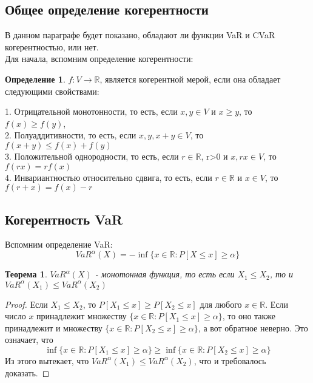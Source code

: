 \documentclass[18pt,a4paper]{article}
\theoremstyle{plain}
\newtheorem{Th}{Теорема}[section]
\theoremstyle{definition}
\newtheorem{Def}{Определение}[section]
\begin{document}
\centering\subsection{Общее определение когерентности}
\flushleft
В данном параграфе будет показано, обладают ли функции VaR и CVaR когерентностью, или нет.\\
Для начала, вспомним определение когерентности:\\
\vspace{1pc}
\begin{Def} \label{main}
$f:V \rightarrow \mathbb{R}$, является когерентной мерой, если она обладает следующими свойствами:

1. Отрицательной монотонности, то есть, если $x,y \in V$ и $x\ge y$, то $f(x) \ge f(y)$,\\

2. Полуаддитивности, то есть, если $x,y,x+y \in V$, то $f(x+y) \le f(x) + f(y)$\\

3. Положительной однородности, то есть, если $r \in \mathbb{R}$, r>0 и $x, rx \in V$, то $f(rx) = rf(x)$ \\

4. Инвариантностью относительно сдвига, то есть, если  $r \in \mathbb{R}$ и $x \in V$, то $f(r+x) = f(x) - r$\\

\end{Def}
\vspace{1pc}
\centering\subsection{Когерентность VaR}
\flushleft
Вспомним определение VaR:
$$
VaR^\alpha(X) = -\inf\{x\in \mathbb{R} : P[X \le x] \ge \alpha\}
$$

\begin{Th} \label{main} $VaR^\alpha(X)$ - монотонная функция, то есть если $ X_1 \le X_2$, то и $ VaR^\alpha(X_1) \le VaR^\alpha(X_2)$
\end{Th}

\begin{proof}
Если $X_1\le X_2$, то $P[X_1 \le x] \ge P[X_2 \le x]$ для любого $x \in \mathbb{R}$. Если число $x$ принадлежит множеству $\{x\in \mathbb{R} : P[X_1 \le x] \ge \alpha\}$, то оно также принадлежит и множеству $\{x\in \mathbb{R} : P[X_2 \le x] \ge \alpha\}$, а вот обратное неверно. Это означает, что
$$
\inf\{x\in \mathbb{R} : P[X_1 \le x] \ge \alpha\} \ge \inf\{x\in \mathbb{R} : P[X_2 \le x] \ge \alpha\}
$$
Из этого вытекает, что $VaR^\alpha(X_1) \le VaR^\alpha(X_2)$, что и требовалось доказать.
\end{proof}
\end{document}
